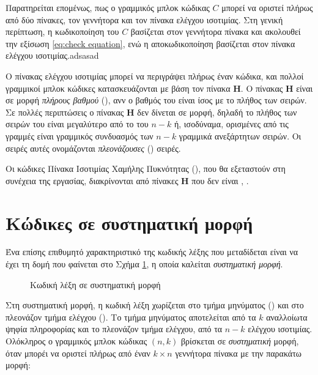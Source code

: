 Παρατηρείται επομένως, πως ο γραμμικός μπλοκ κώδικας $C$ μπορεί να οριστεί πλήρως από δύο πίνακες, τον γεννήτορα και τον πίνακα ελέγχου ισοτιμίας. Στη γενική περίπτωση, η κωδικοποίηση του $C$ βασίζεται στον γεννήτορα πίνακα και ακολουθεί την εξίσωση \ref{eq:check equation}, ενώ η αποκωδικοποίηση βασίζεται στον πίνακα ελέγχου ισοτιμίας.adsasad 

Ο πίνακας ελέγχου ισοτιμίας μπορεί να περιγράψει πλήρως έναν κώδικα, και πολλοί γραμμικοί μπλοκ κώδικες κατασκευάζονται με βάση τον πίνακα $\mathbf{H}$. Ο πίνακας $\mathbf{H}$ είναι σε μορφή \textit{πλήρους βαθμού} (), ανν ο βαθμός του είναι ίσος με το πλήθος των σειρών. Σε πολλές περιπτώσεις ο πίνακας $\mathbf{H}$ δεν δίνεται σε  μορφή, δηλαδή το πλήθος των σειρών του είναι μεγαλύτερο από το  του $n-k$ ή, ισοδύναμα, ορισμένες από τις γραμμές είναι γραμμικός συνδυασμός των $n-k$ γραμμικά ανεξάρτητων σειρών. Οι σειρές αυτές ονομάζονται \textit{πλεονάζουσες} () σειρές. 

Οι κώδικες Πίνακα Ισοτιμίας Χαμήλης Πυκνότητας (), που θα εξεταστούν στη συνέχεια της εργασίας, διακρίνονται από πίνακες $\mathbf{H}$ που δεν είναι  \cite{cover2012elements}, \cite{ryan2009channel}.

\section{Κώδικες σε συστηματική μορφή}
Ένα επίσης επιθυμητό χαρακτηριστικό της κωδικής λέξης που μεταδίδεται είναι να έχει τη δομή που φαίνεται στο Σχήμα \ref{fig:systematic form}, η οποία καλείται \textit{συστηματική μορφή}.

\begin{figure}[h]
\caption{Κωδική λέξη σε συστηματική μορφή}
\label{fig:systematic form}
\end{figure}

Στη συστηματική μορφή, η κωδική λέξη χωρίζεται στο τμήμα μηνύματος () και στο πλεονάζον τμήμα ελέγχου (). Το τμήμα μηνύματος αποτελείται από τα $k$ αναλλοίωτα ψηφία πληροφορίας και το πλεονάζον τμήμα ελέγχου, από τα $n-k$  ελέγχου ισοτιμίας. Ολόκληρος ο γραμμικός μπλοκ κώδικας $(n,k)$ βρίσκεται σε \textit{συστηματική} μορφή, όταν μπορέι να οριστεί πλήρως από έναν $k \times n$ γεννήτορα πίνακα με την παρακάτω μορφή:

